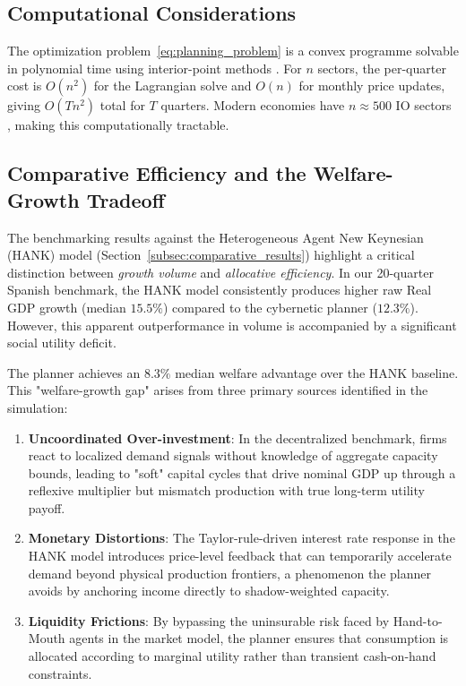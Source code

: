 \subsection{Computational Considerations}

The optimization problem~\eqref{eq:planning_problem} is a convex
programme solvable in polynomial time using interior-point methods
\citep{boyd2004convex}.
For $n$ sectors, the per-quarter cost is $O(n^2)$ for the Lagrangian
solve and $O(n)$ for monthly price updates, giving $O(Tn^2)$ total for
$T$ quarters.
Modern economies have $n \approx 500$ IO sectors
\citep{timmer2015illustrated}, making this computationally tractable.

\subsection{Comparative Efficiency and the Welfare-Growth Tradeoff}

The benchmarking results against the Heterogeneous Agent New Keynesian (HANK) model (Section~\ref{subsec:comparative_results}) highlight a critical distinction between \textit{growth volume} and \textit{allocative efficiency}. In our 20-quarter Spanish benchmark, the HANK model consistently produces higher raw Real GDP growth (median $15.5\%$) compared to the cybernetic planner ($12.3\%$). However, this apparent outperformance in volume is accompanied by a significant social utility deficit.

The planner achieves an $8.3\%$ median welfare advantage over the HANK baseline. This "welfare-growth gap" arises from three primary sources identified in the simulation:
\begin{enumerate}
    \item \textbf{Uncoordinated Over-investment}: In the decentralized benchmark, firms react to localized demand signals without knowledge of aggregate capacity bounds, leading to "soft" capital cycles that drive nominal GDP up through a reflexive multiplier but mismatch production with true long-term utility payoff.
    \item \textbf{Monetary Distortions}: The Taylor-rule-driven interest rate response in the HANK model introduces price-level feedback that can temporarily accelerate demand beyond physical production frontiers, a phenomenon the planner avoids by anchoring income directly to shadow-weighted capacity.
    \item \textbf{Liquidity Frictions}: By bypassing the uninsurable risk faced by Hand-to-Mouth agents in the market model, the planner ensures that consumption is allocated according to marginal utility rather than transient cash-on-hand constraints.
\end{enumerate}

